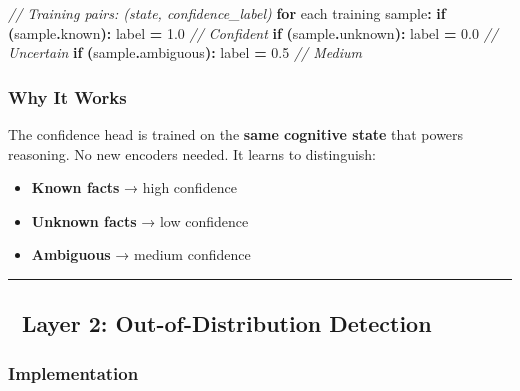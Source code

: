 \documentclass[
  11pt,
  a4paper,
]{article}
\newenvironment{Shaded}{\begin{snugshade}}{\end{snugshade}}
\newcommand{\CommentTok}[1]{\textcolor[rgb]{0.56,0.35,0.01}{\textit{#1}}}
\newcommand{\ControlFlowTok}[1]{\textcolor[rgb]{0.13,0.29,0.53}{\textbf{#1}}}
\newcommand{\FloatTok}[1]{\textcolor[rgb]{0.00,0.00,0.81}{#1}}
\newcommand{\NormalTok}[1]{#1}
\newcommand{\OperatorTok}[1]{\textcolor[rgb]{0.81,0.36,0.00}{\textbf{#1}}}
\providecommand{\tightlist}{%
  \setlength{\itemsep}{0pt}\setlength{\parskip}{0pt}}
\begin{document}
\begin{Shaded}
\begin{Highlighting}[]
\CommentTok{// Training pairs: (state, confidence\_label)}
\ControlFlowTok{for}\NormalTok{ each training sample}\OperatorTok{:}
    \ControlFlowTok{if} \OperatorTok{(}\NormalTok{sample}\OperatorTok{.}\NormalTok{known}\OperatorTok{):}\NormalTok{       label }\OperatorTok{=} \FloatTok{1.0}  \CommentTok{// Confident}
    \ControlFlowTok{if} \OperatorTok{(}\NormalTok{sample}\OperatorTok{.}\NormalTok{unknown}\OperatorTok{):}\NormalTok{     label }\OperatorTok{=} \FloatTok{0.0}  \CommentTok{// Uncertain}
    \ControlFlowTok{if} \OperatorTok{(}\NormalTok{sample}\OperatorTok{.}\NormalTok{ambiguous}\OperatorTok{):}\NormalTok{   label }\OperatorTok{=} \FloatTok{0.5}  \CommentTok{// Medium}
\end{Highlighting}
\end{Shaded}

\subsubsection{Why It Works}\label{why-it-works}

The confidence head is trained on the \textbf{same cognitive state} that
powers reasoning. No new encoders needed. It learns to distinguish:

\begin{itemize}
\tightlist
\item
  \textbf{Known facts} → high confidence
\item
  \textbf{Unknown facts} → low confidence
\item
  \textbf{Ambiguous} → medium confidence
\end{itemize}

\begin{center}\rule{0.5\linewidth}{0.5pt}\end{center}

\subsection{🧩 Layer 2: Out-of-Distribution
Detection}\label{layer-2-out-of-distribution-detection}

\subsubsection{Implementation}\label{implementation-1}
\end{document}
